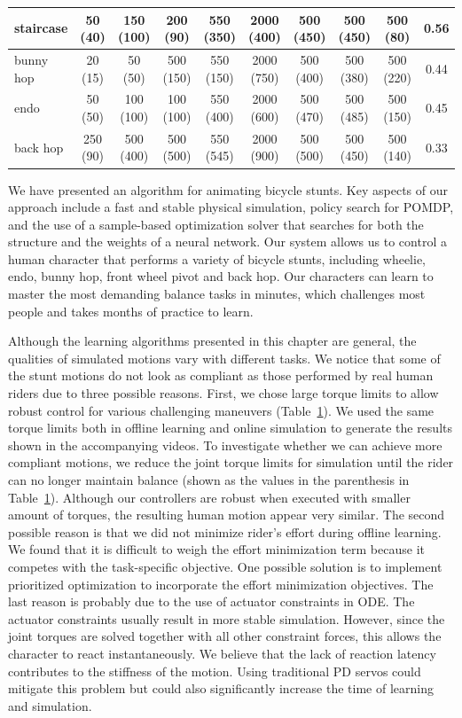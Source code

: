 \begin{table}
\begin{tabular}{|l|c|c|c|c|c|c|c|c|c|}
\hline
staircase & 50 (40) & 150 (100) & 200 (90) & 550 (350) & 2000 (400) & 500 (450) & 500 (450) & 500 (80) & 0.56 \\
\hline
bunny hop & 20 (15) & 50 (50) & 500 (150) & 550 (150) & 2000 (750) & 500 (400) & 500 (380) & 500 (220) & 0.44\\
\hline
endo & 50 (50) & 100 (100) & 100 (100) & 550 (400) & 2000 (600) & 500 (470) & 500 (485) & 500 (150) & 0.45\\
\hline
back hop & 250 (90) & 500 (400) & 500 (500) & 550 (545) & 2000 (900) & 500 (500) & 500 (450) & 500 (140) & 0.33\\
\hline
 \end{tabular}
 \label{table:torqueLimit}
\end{table}


We have presented an algorithm for animating bicycle stunts.  Key aspects of our approach include a fast and stable physical simulation,
policy search for POMDP, and
the use of a sample-based optimization solver that searches for both the structure and the weights of a neural network.
Our system allows us to control a human character that
performs a variety of bicycle stunts, including wheelie, endo, bunny hop, front wheel pivot and back hop.
Our characters can learn to master the most demanding balance tasks in minutes, which challenges most people and takes months of practice to learn.

Although the learning algorithms presented in this chapter are general, the qualities of simulated motions vary with different tasks. We notice that some of the stunt motions do not look as compliant as those performed by real human riders due to three possible reasons. First, we chose large torque limits to allow robust control for various challenging maneuvers (Table~\ref{table:torqueLimit}). We used the same torque limits both in offline learning and online simulation to generate the results shown in the accompanying videos. To investigate whether we can achieve more compliant motions, we reduce the joint torque limits for simulation until the rider can no longer maintain balance (shown as the values in the parenthesis in Table~\ref{table:torqueLimit}). Although our controllers are robust when executed with smaller amount of torques, the resulting human motion appear very similar. The second possible reason is that we did not minimize rider's effort during offline learning. We found that it is difficult to weigh the effort minimization term because it competes with the task-specific objective. One possible solution is to implement prioritized optimization \cite{delasa:2009} to incorporate the effort minimization objectives. The last reason is probably due to the use of actuator constraints in ODE. The actuator constraints usually result in more stable simulation. However, since the joint torques are solved together with all other constraint forces, this allows the character to react instantaneously. We believe that the lack of reaction latency contributes to the stiffness of the motion. Using traditional PD servos could mitigate this problem but could also significantly increase the time of learning and simulation.

